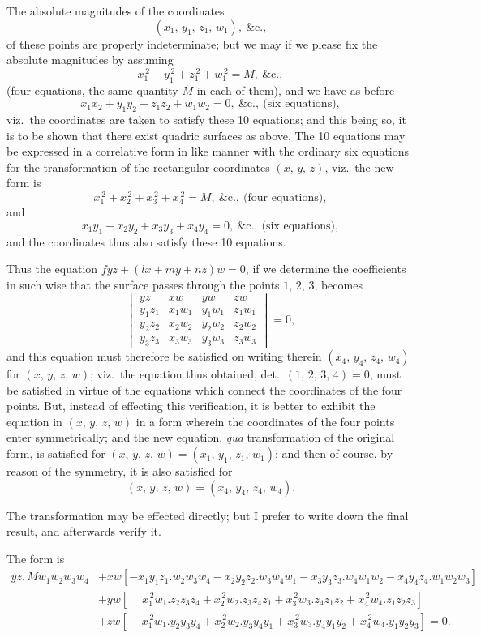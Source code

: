 \documentclass[11pt,a4paper]{book}
\begin{document}
The absolute magnitudes of the coordinates
\[ (x_1,\, y_1,\, z_1,\, w_1),\ \&\text{c.}, \]
of these points are properly indeterminate; but we may if we please fix the absolute magnitudes by assuming
\[ x_1^{\,2} + y_1^{\,2} + z_1^{\,2} + w_1^{\,2} = M,\ \&\text{c.}, \]
(four equations, the same quantity $M$ in each of them), and we have as before
\[ x_1x_2 + y_1y_2 + z_1z_2 + w_1w_2 = 0,\ \&\text{c.},\ \text{(six equations)}, \]
viz.\ the coordinates are taken to satisfy these 10 equations; and this being so, it is to be shown that there exist quadric surfaces as above. The 10 equations may be expressed in a correlative form in like manner with the ordinary six equations for the transformation of the rectangular coordinates $(x,\, y,\, z)$, viz.\ the new form is
\[ x_1^{\,2} + x_2^{\,2} + x_3^{\,2} + x_4^{\,2} = M,\ \&\text{c.},\ \text{(four equations)}, \]
and
\[ x_1y_1 + x_2y_2 + x_3y_3 + x_4y_4 = 0,\ \&\text{c.},\ \text{(six equations)}, \]
and the coordinates thus also satisfy these 10 equations.

Thus the equation $fyz + (lx + my + nz)w = 0$, if we determine the coefficients in such wise that the surface passes through the points $1$, $2$, $3$, becomes
\[
\begin{vmatrix}
yz & xw & yw & zw \\
y_1z_1 & x_1w_1 & y_1w_1 & z_1w_1 \\
y_2z_2 & x_2w_2 & y_2w_2 & z_2w_2 \\
y_3z_3 & x_3w_3 & y_3w_3 & z_3w_3
\end{vmatrix} = 0,
\]
and this equation must therefore be satisfied on writing therein $(x_4,\, y_4,\, z_4,\, w_4)$ for $(x,\, y,\, z,\, w)$; viz.\ the equation thus obtained, det.\ $(1,\, 2,\, 3,\, 4) = 0$, must be satisfied in virtue of the equations which connect the coordinates of the four points. But, instead of effecting this verification, it is better to exhibit the equation in $(x,\, y,\, z,\, w)$ in a form wherein the coordinates of the four points enter symmetrically; and the new equation, \textit{qua} transformation of the original form, is satisfied for $(x,\, y,\, z,\, w) = (x_1,\, y_1,\, z_1,\, w_1)$: and then of course, by reason of the symmetry, it is also satisfied for
\[ (x,\, y,\, z,\, w) = (x_4,\, y_4,\, z_4,\, w_4). \]

The transformation may be effected directly; but I prefer to write down the final result, and afterwards verify it.

The form is
\begin{align*}
yz .\, Mw_1w_2w_3w_4 &+ xw[-x_1y_1z_1 . w_2w_3w_4 - x_2y_2z_2 . w_3w_4w_1 - x_3y_3z_3 . w_4w_1w_2 - x_4y_4z_4 . w_1w_2w_3] \\
&+ yw[\phantom{-}x_1^{\,2}w_1 . z_2z_3z_4 + x_2^{\,2}w_2 . z_3z_4z_1 + x_3^{\,2}w_3 . z_4z_1z_2 + x_4^{\,2}w_4 . z_1z_2z_3] \\
&+ zw[\phantom{-}x_1^{\,2}w_1 . y_2y_3y_4 + x_2^{\,2}w_2 . y_3y_4y_1 + x_3^{\,2}w_3 . y_4y_1y_2 + x_4^{\,2}w_4 . y_1y_2y_3] = 0.
\end{align*}
\end{document}
